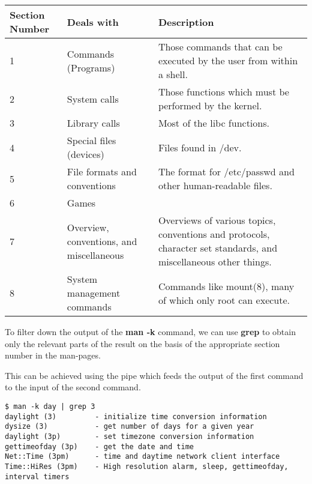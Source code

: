 \vspace{-5pt}
\noindent
\begin{tabular}{p{}p{}p{}}
	\toprule
	Section Number & Deals with & Description \\
	\midrule
	1 & Commands (Programs) & Those  commands  that  can  be executed  by the user from within a	shell. \\
	2 & System calls & Those functions which must be performed by the kernel. \\
	3 & Library calls & Most of the libc functions. \\
	4 & Special files (devices) & Files found in /dev. \\
	5 & File formats and conventions & The format for /etc/passwd and other human-readable files. \\
	6 & Games & \\
	7 & Overview, conventions, and miscellaneous & Overviews of various topics, conventions and  protocols,  character set standards, and miscellaneous other things. \\
	8 & System management commands & Commands like mount(8), many of which only root can execute.	\\
	\bottomrule
\end{tabular}

\noindent
To filter down the output of the \textbf{man -k} command, we can use \textbf{grep} to obtain only the relevant parts of the result on the basis of the appropriate section number in the man-pages.

\noindent
This can be achieved using the pipe which feeds the output of the first command to the input of the second command.

\vspace{-20pt}
\begin{verbatim}
$ man -k day | grep 3
daylight (3)         - initialize time conversion information
dysize (3)           - get number of days for a given year
daylight (3p)        - set timezone conversion information
gettimeofday (3p)    - get the date and time
Net::Time (3pm)      - time and daytime network client interface
Time::HiRes (3pm)    - High resolution alarm, sleep, gettimeofday, interval timers
\end{verbatim}

\vspace{-20pt}
\noindent

